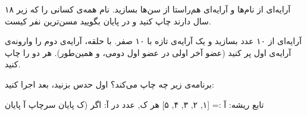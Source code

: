 \exercise آرایه‌ای از نام‌ها و آرایه‌ای هم‌راستا از سن‌ها بسازید. نام همه‌ی
کسانی را که زیر ۱۸ سال دارند چاپ کنید و در پایان بگویید مسن‌ترین نفر
کیست.

\exercise آرایه‌ای از ۱۰ عدد بسازید و یک آرایه‌ی تازه با
۱۰ صفر. با حلقه، آرایه‌ی دوم را وارونه‌ی آرایه‌ی اول پر کنید (عضو آخر اولی
در عضو اول دومی، و همین‌طور). هر دو را چاپ کنید.

\exercise برنامه‌ی زیر چه چاپ می‌کند؟ اول حدس بزنید، بعد اجرا کنید:
\begin{salamfa}
تابع ریشه:
    آ := [۱, ۲, ۳, ۴, ۵]
    هر ک, عدد در آ:
        اگر (ک %
    پایان
    سرچاپ آ
پایان
\end{salamfa}
